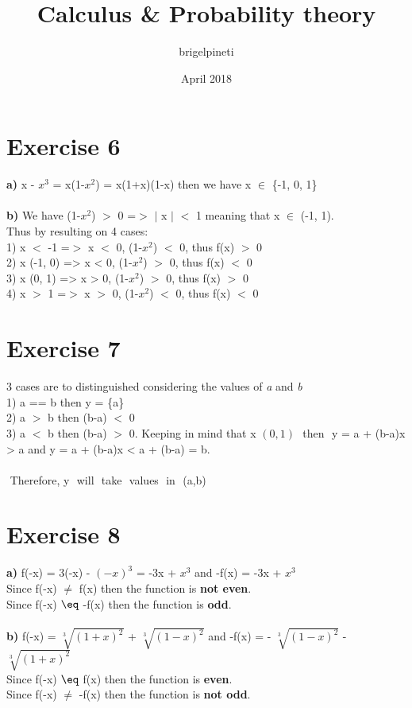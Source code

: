 \documentclass{article}
\title{Calculus & Probability theory}
\author{brigelpineti }
\date{April 2018}
\begin{document}
  \maketitle
  \section*{Exercise 6}
  
  
  \textbf{a)} x - $x^3$ = x(1-$x^2$) = x(1+x)(1-x) then we have x $\in$ \{-1, 0, 1\} \\ \\
  \textbf{b)} We have (1-$x^2$) $>$ 0 =$>$ $\vert$ x $\vert$ $<$ 1 meaning that x $\in$ (-1, 1). \\ 
  Thus by resulting on 4 cases: \\
  1) x $<$ -1 =$>$ x $<$ 0, (1-$x^2$) $<$ 0, thus f(x) $>$ 0 \\
  2) x \in (-1, 0) => x < 0, (1-$x^2$) $>$ 0, thus f(x) $<$ 0 \\
  3) x \in (0, 1) => x > 0, (1-$x^2$) $>$ 0, thus f(x) $>$ 0 \\
  4) x $>$ 1 =$>$ x $>$ 0, (1-$x^2$) $<$ 0, thus f(x) $<$ 0
  
  
  \section*{Exercise 7}
  
  3 cases are to distinguished considering the values of \textit{a} and \textit{b} \\
  1) a == b then y = \{a\} \\
  2) a $>$ b then (b-a) $<$ 0 \\
  3) a $<$ b then (b-a) $>$ 0. Keeping in mind that x \in $(0,1)$ $ $ then $ $ y = a + (b-a)x > a and y = a + (b-a)x < a + (b-a) = b.  $ $\\ \\
  $ $ Therefore, y $ $ will $ $ take $ $ values $ $ in $ $ (a,b) \\ 
  
  \section*{Exercise 8}
  
  \textbf{a)} f(-x) = 3(-x) - $(-x)^3$ = -3x + $x^3$ and -f(x) = -3x + $x^3$ \\
  Since f(-x) $\neq$ f(x) then the function is \textbf{not even}. \\
  Since f(-x) $\eq$ -f(x) then the function is \textbf{odd}. \\ \\
  \textbf{b)} f(-x) = $\sqrt[3]{(1+x)^2}$ + $\sqrt[3]{(1-x)^2}$ and -f(x) = - $\sqrt[3]{(1-x)^2}$ - $\sqrt[3]{(1+x)^2}$ \\
  Since f(-x) $\eq$ f(x) then the function is \textbf{even}. \\
  Since f(-x) $\neq$ -f(x) then the function is \textbf{not odd}.
  
\end{document}
